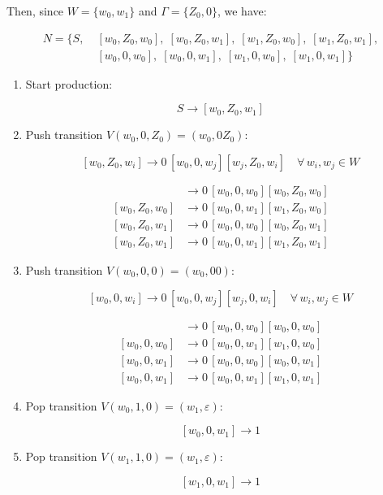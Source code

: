 \documentclass[12pt,a4paper,openany]{article}
\begin{document}
\begin{enumerate}
Then, since $W = \{w_0, w_1\}$ and $\Gamma = \{Z_0, 0\}$, we have:

\begin{align*}
N = \{S,\;
&[w_0,Z_0,w_0],\; [w_0,Z_0,w_1],\;
 [w_1,Z_0,w_0],\; [w_1,Z_0,w_1], \\
&[w_0,0,w_0],\;   [w_0,0,w_1],\;
 [w_1,0,w_0],\;   [w_1,0,w_1]\}
\end{align*}

\begin{enumerate}

\item Start production:

\[
S \to [w_0, Z_0, w_1]
\]

\item Push transition $V(w_0, 0, Z_0) = (w_0, 0Z_0)$:

\[
[w_0, Z_0, w_i] \to 0\,[w_0, 0, w_j][w_j, Z_0, w_i] \quad \forall\, w_i, w_j \in W
\]

\begin{align*}
[w_0, Z_0, w_0] &\to 0\,[w_0, 0, w_0][w_0, Z_0, w_0] \\
[w_0, Z_0, w_0] &\to 0\,[w_0, 0, w_1][w_1, Z_0, w_0]\\
[w_0, Z_0, w_1] &\to 0\,[w_0, 0, w_0][w_0, Z_0, w_1]\\
[w_0, Z_0, w_1] &\to 0\,[w_0, 0, w_1][w_1, Z_0, w_1]
\end{align*}

\item Push transition $V(w_0, 0, 0) = (w_0, 00)$:

\[
[w_0, 0, w_i] \to 0\,[w_0, 0, w_j][w_j, 0, w_i] \quad \forall\, w_i, w_j \in W
\]

\begin{align*}
[w_0, 0, w_0] &\to 0\,[w_0, 0, w_0][w_0, 0, w_0]\\
[w_0, 0, w_0] &\to 0\,[w_0, 0, w_1][w_1, 0, w_0]\\
[w_0, 0, w_1] &\to 0\,[w_0, 0, w_0][w_0, 0, w_1]\\
[w_0, 0, w_1] &\to 0\,[w_0, 0, w_1][w_1, 0, w_1]
\end{align*}

\item Pop transition $V(w_0, 1, 0) = (w_1, \varepsilon)$:

\[
[w_0, 0, w_1] \to 1
\]

\item Pop transition $V(w_1, 1, 0) = (w_1, \varepsilon)$:

\[
[w_1, 0, w_1] \to 1
\]


\end{enumerate}
\end{enumerate}
\end{document}
